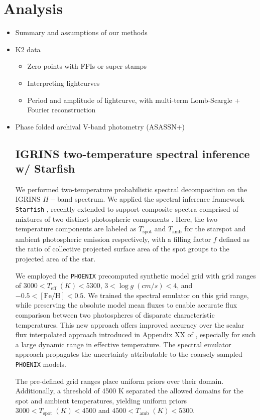 \documentclass[twocolumn]{emulateapj}%
\begin{document}
\section{Analysis}
\begin{itemize}
\item Summary and assumptions of our methods
\item K2 data
\begin{itemize}
  \item Zero points with FFIs or super stamps
  \item Interpreting lightcurves
  \item Period and amplitude of lightcurve, with multi-term Lomb-Scargle + Fourier reconstruction
\end{itemize}
\item Phase folded archival V-band photometry (ASASSN+)
\subsection{IGRINS two-temperature spectral inference w/ Starfish}

We performed two-temperature probabilistic spectral decomposition on the IGRINS $H-$band spectrum.  We applied the spectral inference framework \texttt{Starfish} \citep{czekala15}, recently extended to support composite spectra comprised of mixtures of two distinct photospheric components \citep{gullysantiago17}.  Here, the two temperature components are labeled as $T_{\mathrm{spot}}$ and $T_{\mathrm{amb}}$ for the starspot and ambient photospheric emission respectively, with a filling factor $f$ defined as the ratio of collective projected surface area of the spot groups to the projected area of the star.

We employed the \texttt{PHOENIX} precomputed synthetic model grid with grid ranges of $3000 < T_{\mathrm{eff}} \; (K) < 5300 $, $3 < \log{g \;(cm/s)}  < 4 $, and $ -0.5 <  [\mathrm{Fe}/\mathrm{H}] <0.5$.  We trained the spectral emulator \citep{czekala15} on this grid range, while preserving the absolute model mean fluxes to enable accurate flux comparison between two photospheres of disparate characteristic temperatures.  This new approach offers improved accuracy over the scalar flux interpolated approach introduced in Appendix XX of \citet{gullysantiago17}, especially for such a large dynamic range in effective temperature.  The spectral emulator approach propagates the uncertainty attributable to the coarsely sampled \texttt{PHOENIX} models.

The pre-defined grid ranges place uniform priors over their domain.  Additionally, a threshold of 4500 K separated the allowed domains for the spot and ambient temperatures, yielding uniform priors $3000 < T_{\mathrm{spot}} \; (K) < 4500 $ and $4500 < T_{\mathrm{amb}} \; (K) < 5300$.


\end{itemize}
\end{document}
